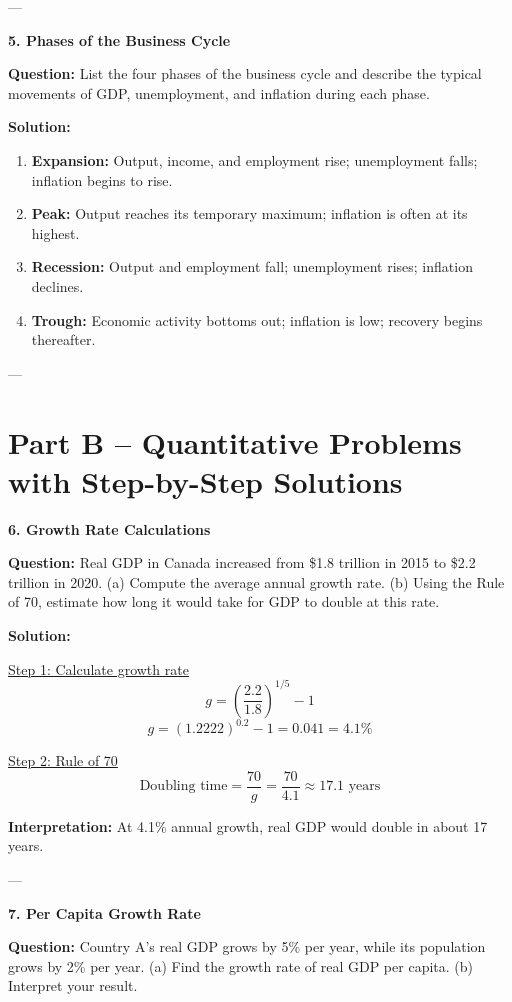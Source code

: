 \documentclass[12pt]{article}
\begin{document}
---

\textbf{5. Phases of the Business Cycle}

\textbf{Question:}  
List the four phases of the business cycle and describe the typical movements of GDP, unemployment, and inflation during each phase.

\textbf{Solution:}  
\begin{enumerate}
    \item \textbf{Expansion:} Output, income, and employment rise; unemployment falls; inflation begins to rise.
    \item \textbf{Peak:} Output reaches its temporary maximum; inflation is often at its highest.
    \item \textbf{Recession:} Output and employment fall; unemployment rises; inflation declines.
    \item \textbf{Trough:} Economic activity bottoms out; inflation is low; recovery begins thereafter.
\end{enumerate}

---

\section*{Part B – Quantitative Problems with Step-by-Step Solutions}

\textbf{6. Growth Rate Calculations}

\textbf{Question:}  
Real GDP in Canada increased from \$1.8 trillion in 2015 to \$2.2 trillion in 2020.  
(a) Compute the average annual growth rate.  
(b) Using the Rule of 70, estimate how long it would take for GDP to double at this rate.

\textbf{Solution:}

\underline{Step 1: Calculate growth rate}
\[
g = \left(\frac{2.2}{1.8}\right)^{1/5} - 1
\]
\[
g = (1.2222)^{0.2} - 1 = 0.041 = 4.1\%
\]

\underline{Step 2: Rule of 70}
\[
\text{Doubling time} = \frac{70}{g} = \frac{70}{4.1} \approx 17.1 \text{ years}
\]

\textbf{Interpretation:}  
At 4.1\% annual growth, real GDP would double in about 17 years.

---

\textbf{7. Per Capita Growth Rate}

\textbf{Question:}  
Country A’s real GDP grows by 5\% per year, while its population grows by 2\% per year.  
(a) Find the growth rate of real GDP per capita.  
(b) Interpret your result.
\end{document}
